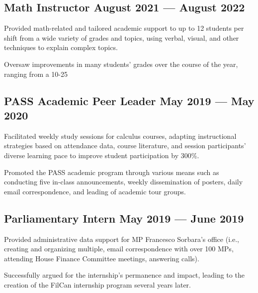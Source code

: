 \subsection{{Math Instructor \hfill August 2021 --- August 2022}}
\begin{zitemize}
\item Provided math-related and tailored academic support to up to 12 students per shift from a wide variety of grades and topics, using verbal, visual, and other techniques to explain complex topics.
\item Oversaw improvements in many students’ grades over the course of the year, ranging from a 10-25%
\end{zitemize}

\subsection{{PASS Academic Peer Leader \hfill May 2019 --- May 2020}}
\begin{zitemize}
\item Facilitated weekly study sessions for calculus courses, adapting instructional strategies based on attendance data, course literature, and session participants’ diverse learning pace to improve student participation by 300\%.
\item Promoted the PASS academic program through various means such as conducting five in-class announcements, weekly dissemination of posters, daily email correspondence, and leading of academic tour groups.
\end{zitemize}

\subsection{{Parliamentary Intern \hfill May 2019 --- June 2019}}
\begin{zitemize}
\item Provided administrative data support for MP Francesco Sorbara's office (i.e., creating and organizing multiple, email correspondence with over 100 MPs, attending House Finance Committee meetings, answering calls).
\item Successfully argued for the internship's permanence and impact, leading to the creation of the FilCan internship program several years later.
\end{zitemize}

